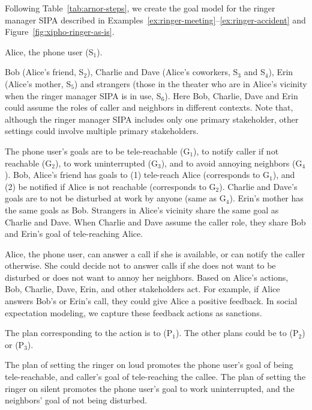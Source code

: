 Following Table~\ref{tab:arnor-steps}, we create the goal
model for the ringer manager SIPA described in Examples~\ref{ex:ringer-meeting}--\ref{ex:ringer-accident} and Figure~\ref{fig:xipho-ringer-as-is}.

\begin{description}[leftmargin=1em]
  
  \item[Primary stakeholder.] Alice, the phone user (S$_1$). 

\item[Secondary stakeholders.] Bob (Alice's friend, S$_2$), Charlie and
Dave (Alice's coworkers, S$_3$ and S$_4$), Erin (Alice's mother, S$_5$)
and strangers (those in the theater who are in Alice's vicinity when
the ringer manager SIPA is in use, S$_6$). Here Bob, Charlie, Dave and Erin
could assume the roles of caller and neighbors in different contexts.
Note that, although the ringer manager SIPA includes only one primary
stakeholder, other settings could involve multiple primary stakeholders.

\item[Goals.] The phone user's goals are to be
tele-reachable (G$_1$), to notify caller if not reachable (G$_2$), to
work uninterrupted (G$_3$), and to avoid annoying
neighbors (G$_4$). Bob, Alice's friend has goals to (1) tele-reach Alice
(corresponds to G$_1$), and (2) be notified if Alice is not reachable
(corresponds to G$_2$). Charlie and Dave's goals are to not be disturbed
at work by anyone (same as G$_4$). Erin's mother has the same goals as
Bob. Strangers in Alice's vicinity share the same goal as Charlie and
Dave. When Charlie and Dave assume the caller role, they share Bob and 
Erin's goal of tele-reaching Alice.
  
\item[Actions.] Alice, the phone user, can answer a call if she is
available, or can notify the caller otherwise. She could
decide not to answer calls if she does not want to be disturbed or does
not want to annoy her neighbors. Based on Alice's actions, Bob, Charlie,
Dave, Erin, and other stakeholders act. For example, if Alice answers
Bob's or Erin's call, they could give Alice a positive feedback. In social
expectation modeling, we capture these feedback actions as sanctions. 

\item[Plans.] The plan corresponding to the  action is to
 (P$_1$). The other plans could be to
 (P$_2$) or  (P$_3$).

\item[Goal-plan association.] The plan of setting the ringer on
loud promotes the phone user's goal of being tele-reachable, and
caller's goal of tele-reaching the callee. The plan of setting the
ringer on silent promotes the phone user's goal to work
uninterrupted, and the neighbors' goal of not being disturbed.
\end{description}

